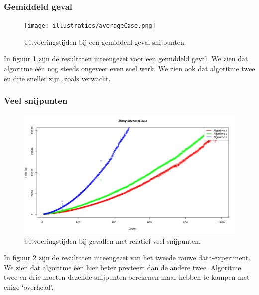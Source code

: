 \subsubsection{Gemiddeld geval}
\begin{figure}[H]
	\centering
   	\texttt{[image: illustraties/averageCase.png]}
  	\caption{Uitvoeringstijden bij een gemiddeld geval snijpunten.}
  	\label{fig:average_case}
\end{figure}
In figuur \ref{fig:average_case} zijn de resultaten uiteengezet voor een gemiddeld geval. We zien dat algoritme \'e\'en nog steeds ongeveer even snel werk. We zien ook dat algoritme twee en drie sneller zijn, zoals verwacht.
   
\subsubsection{Veel snijpunten}
\begin{figure}[H]
   	\centering
   	\includegraphics[width=\textwidth]{illustraties/manyIntersections.png}
  	\caption{Uitvoeringstijden bij gevallen met relatief veel snijpunten.}
   	\label{fig:many_intersections}
\end{figure}
In figuur \ref{fig:many_intersections} zijn de resultaten uiteengezet van het tweede rauwe data-experiment. We zien dat algoritme \'e\'en hier beter presteert dan de andere twee. Algoritme twee en drie moeten dezelfde snijpunten berekenen maar hebben te kampen met enige `overhead'.

